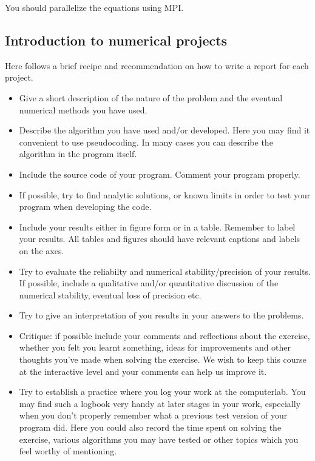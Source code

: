 \documentclass[%
oneside,                 %
final,                   %
10pt]{article}
\begin{document}
You should parallelize the equations using MPI. 


\subsection*{Introduction to numerical projects}

Here follows a brief recipe and recommendation on how to write a report for each
project.

\begin{itemize}
  \item Give a short description of the nature of the problem and the eventual  numerical methods you have used.

  \item Describe the algorithm you have used and/or developed. Here you may find it convenient to use pseudocoding. In many cases you can describe the algorithm in the program itself.

  \item Include the source code of your program. Comment your program properly.

  \item If possible, try to find analytic solutions, or known limits in order to test your program when developing the code.

  \item Include your results either in figure form or in a table. Remember to        label your results. All tables and figures should have relevant captions        and labels on the axes.

  \item Try to evaluate the reliabilty and numerical stability/precision of your results. If possible, include a qualitative and/or quantitative discussion of the numerical stability, eventual loss of precision etc.

  \item Try to give an interpretation of you results in your answers to  the problems.

  \item Critique: if possible include your comments and reflections about the  exercise, whether you felt you learnt something, ideas for improvements and  other thoughts you've made when solving the exercise. We wish to keep this course at the interactive level and your comments can help us improve it.

  \item Try to establish a practice where you log your work at the  computerlab. You may find such a logbook very handy at later stages in your work, especially when you don't properly remember  what a previous test version  of your program did. Here you could also record  the time spent on solving the exercise, various algorithms you may have tested or other topics which you feel worthy of mentioning.
\end{itemize}
\end{document}
